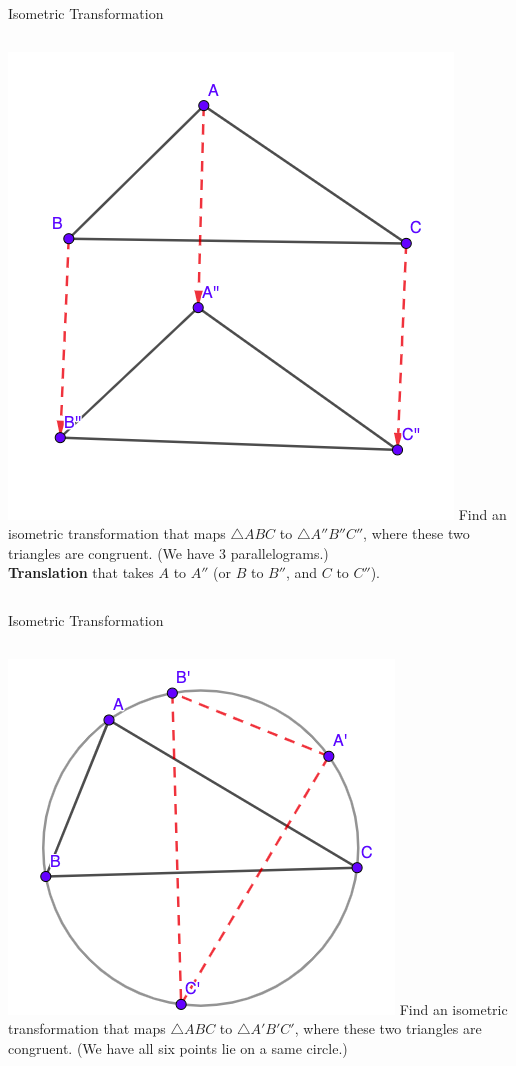 \documentclass{beamer}
\begin{document}
\begin{frame}{Isometric Transformation}
	\begin{columns}
		\includegraphics[scale=0.4]{iso5.png}
		Find an isometric transformation that maps $\triangle
		ABC$ to $\triangle A''B''C''$, where these two triangles
		are congruent. (We have 3 parallelograms.)\\
		\phantom{Spacing}
		\textbf{Translation} that takes $A$ to $A''$ (or $B$ to
		$B''$, and $C$ to $C''$).
	\end{columns}
\end{frame}
\begin{frame}{Isometric Transformation}
	\begin{columns}
		\column{0.6\textwidth}
		\includegraphics[scale=0.4]{iso6.png}
		\column{0.4\textwidth}
		Find an isometric transformation that maps $\triangle
		ABC$ to $\triangle A'B'C'$, where these two triangles
		are congruent. (We have all six points lie on a same
		circle.)
	\end{columns}
\end{frame}
\end{document}
